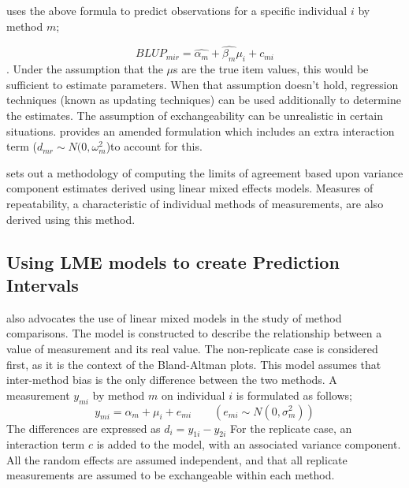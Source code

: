 \documentclass[12pt, a4paper]{report}
\theoremstyle{plain}
\theoremstyle{definition}
\theoremstyle{remark}
\begin{document}

\citet{BXC2004} uses the above formula to predict observations for
a specific individual $i$ by method $m$;

\begin{equation}BLUP_{mir} = \hat{\alpha_{m}} + \hat{\beta_{m}}\mu_{i} +
c_{mi} \end{equation}. Under the assumption that the $\mu$s are
the true item values, this would be sufficient to estimate
parameters. When that assumption doesn't hold, regression
techniques (known as updating techniques) can be used additionally
to determine the estimates. The assumption of exchangeability can
be unrealistic in certain situations. \citet{BXC2004} provides an
amended formulation which includes an extra interaction term ($
d_{mr} \sim N(0,\omega^{2}_{m}$)to account for this.


\newpage
\citet{BXC2008} sets out a methodology of computing the limits of
agreement based upon variance component estimates derived using
linear mixed effects models. Measures of repeatability, a
characteristic of individual methods of measurements, are also
derived using this method.

\subsection{Using LME models to create Prediction Intervals}
\citet{BXC2004} also advocates the use of linear mixed models in
the study of method comparisons. The model is constructed to
describe the relationship between a value of measurement and its
real value. The non-replicate case is considered first, as it is
the context of the Bland-Altman plots. This model assumes that
inter-method bias is the only difference between the two methods.
A measurement $y_{mi}$ by method $m$ on individual $i$ is
formulated as follows;
\begin{equation}
y_{mi}  = \alpha_{m} + \mu_{i} + e_{mi} \qquad ( e_{mi} \sim
N(0,\sigma^{2}_{m}))
\end{equation}
The differences are expressed as $d_{i} = y_{1i} - y_{2i}$ For the
replicate case, an interaction term $c$ is added to the model,
with an associated variance component. All the random effects are
assumed independent, and that all replicate measurements are
assumed to be exchangeable within each method.
\end{document}
